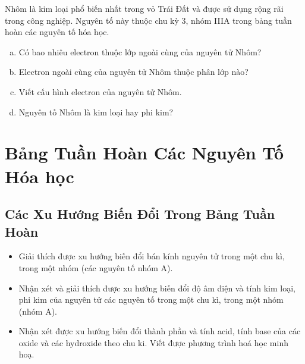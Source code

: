 \begin{bt}
	Nhôm là kim loại phổ biến nhất trong vỏ Trái Đất và được sử dụng rộng rãi trong công nghiệp. Nguyên tố này thuộc chu kỳ 3, nhóm IIIA trong bảng tuần hoàn các nguyên tố hóa học.
	\begin{enumerate}[a)]
		\item Có bao nhiêu electron thuộc lớp ngoài cùng của nguyên tử Nhôm?
		\item Electron ngoài cùng của nguyên tử Nhôm thuộc phân lớp nào?
		\item Viết cấu hình electron của nguyên tử Nhôm.
		\item Nguyên tố Nhôm là kim loại hay phi kim?
	\end{enumerate}
\end{bt}
\chapter{Bảng Tuần Hoàn Các Nguyên Tố Hóa học}
\section{Các Xu Hướng Biến Đổi Trong Bảng Tuần Hoàn}
\begin{mtbh}
	\begin{itemize}
		\item Giải thích được xu hướng biến đổi bán kính nguyên tử trong một chu kì, trong một nhóm (các nguyên tố nhóm A).
		\item Nhận xét và giải thích được xu hướng biến đổi độ âm điện và tính kim loại, phi kim của nguyên tử các nguyên tố trong một chu kì, trong một nhóm (nhóm A).
		\item Nhận xét được xu hướng biến đổi thành phần và tính acid, tính base của các oxide và các hydroxide theo chu ki. Viết được phương trình hoá học minh hoạ.
	\end{itemize}
\end{mtbh}
